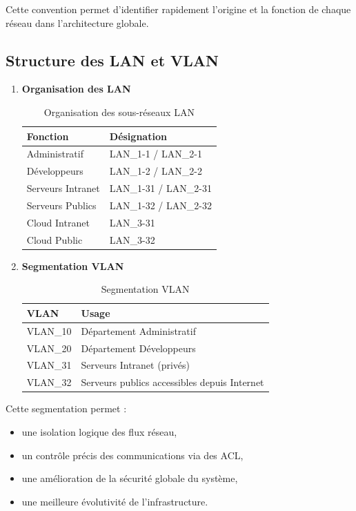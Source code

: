 \documentclass[12pt,a4paper, oneside]{memoir}
\begin{document}
Cette convention permet d’identifier rapidement l’origine et la fonction de chaque réseau dans l’architecture globale.

\subsection{Structure des LAN et VLAN}
	\begin{enumerate}
		\item \textbf{Organisation des LAN}

\begin{table}[H]
	\centering
	\renewcommand{\arraystretch}{1.3}
	\begin{tabular}{|l|l|}
		\hline
		\textbf{Fonction} & \textbf{Désignation} \\
		\hline
		Administratif & LAN\_1-1 / LAN\_2-1 \\
		Développeurs & LAN\_1-2 / LAN\_2-2 \\
		Serveurs Intranet & LAN\_1-31 / LAN\_2-31 \\
		Serveurs Publics & LAN\_1-32 / LAN\_2-32 \\
		Cloud Intranet & LAN\_3-31 \\
		Cloud Public & LAN\_3-32 \\
		\hline
	\end{tabular}
	\caption{Organisation des sous-réseaux LAN}
\end{table}

	\item \textbf{Segmentation VLAN}

\begin{table}[H]
	\centering
	\renewcommand{\arraystretch}{1.3}
	\begin{tabular}{|l|l|}
		\hline
		\textbf{VLAN} & \textbf{Usage} \\
		\hline
		VLAN\_10 & Département Administratif \\
		VLAN\_20 & Département Développeurs \\
		VLAN\_31 & Serveurs Intranet (privés) \\
		VLAN\_32 & Serveurs publics accessibles depuis Internet \\
		\hline
	\end{tabular}
	\caption{Segmentation VLAN}
\end{table}
\end{enumerate}

Cette segmentation permet :

\begin{itemize}
	\item une isolation logique des flux réseau,
	\item un contrôle précis des communications via des ACL,
	\item une amélioration de la sécurité globale du système,
	\item une meilleure évolutivité de l’infrastructure.
\end{itemize}
\end{document}
